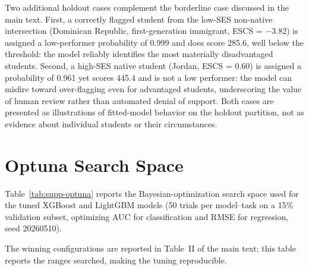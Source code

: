 \documentclass[journal]{IEEEtran}
\begin{document}
Two additional holdout cases complement the borderline case discussed in the main text. First, a correctly flagged student from the low-SES non-native intersection (Dominican Republic, first-generation immigrant, ESCS = $-3.82$) is assigned a low-performer probability of 0.999 and does score 285.6, well below the threshold: the model reliably identifies the most materially disadvantaged students. Second, a high-SES native student (Jordan, ESCS = 0.60) is assigned a probability of 0.961 yet scores 445.4 and is not a low performer: the model can misfire toward over-flagging even for advantaged students, underscoring the value of human review rather than automated denial of support. Both cases are presented as illustrations of fitted-model behavior on the holdout partition, not as evidence about individual students or their circumstances.

\section{Optuna Search Space}
\label{sec:s10}

Table~\ref{tab:supp-optuna} reports the Bayesian-optimization search space used for the tuned XGBoost and LightGBM models (50 trials per model--task on a 15\% validation subset, optimizing AUC for classification and RMSE for regression, seed 20260510).

\begin{table}[!t]
\centering
\caption{Optuna Search Space for Tuned Ensemble Models}
\label{tab:supp-optuna}
\footnotesize
{}
\vspace{2pt}
{\footnotesize The winning configurations are reported in Table~II of the main text; this table reports the ranges searched, making the tuning reproducible.}
\end{table}



\end{document}
